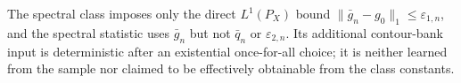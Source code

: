 The spectral class imposes only the direct \(L^1(P_X)\) bound \(\lVert\bar g_n-g_0\rVert_1\le\varepsilon_{1,n}\), and the spectral statistic uses \(\bar g_n\) but not \(\bar q_n\) or \(\varepsilon_{2,n}\).  Its additional contour-bank input is deterministic after an existential once-for-all choice; it is neither learned from the sample nor claimed to be effectively obtainable from the class constants.
